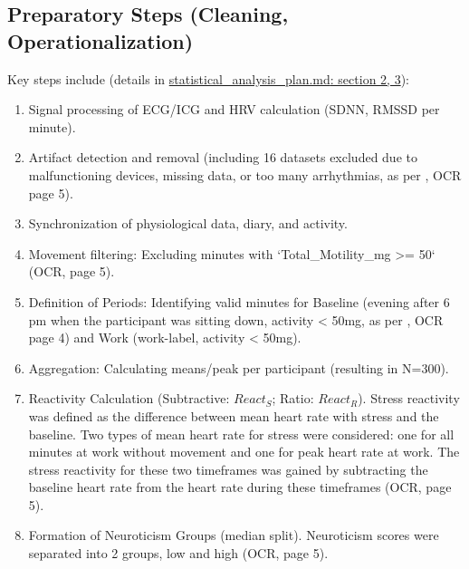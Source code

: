 \documentclass[11pt, a4paper]{report}
\newcommand{\mdcitesec}[2]{\href{run:./sources/#1}{\url{#1}: section #2}}
\begin{document}
\subsection{Preparatory Steps (Cleaning, Operationalization)}
\label{subsec:cleaning_operationalization_method} %
Key steps include (details in \mdcitesec{statistical_analysis_plan.md}{2, 3}):
\begin{enumerate}
    \item Signal processing of ECG/ICG and HRV calculation (SDNN, RMSSD per minute).
    \item Artifact detection and removal (including 16 datasets excluded due to malfunctioning devices, missing data, or too many arrhythmias, as per \cite{ThesisTempPDF}, OCR page 5).
    \item Synchronization of physiological data, diary, and activity.
    \item Movement filtering: Excluding minutes with `Total_Motility_mg >= 50` \cite{ThesisTempPDF} (OCR, page 5).
    \item Definition of Periods: Identifying valid minutes for Baseline (evening after 6 pm when the participant was sitting down, activity < 50mg, as per \cite{ThesisTempPDF}, OCR page 4) and Work (work-label, activity < 50mg).
    \item Aggregation: Calculating means/peak per participant (resulting in N=300).
    \item Reactivity Calculation (Subtractive: $React_S$; Ratio: $React_R$). Stress reactivity was defined as the difference between mean heart rate with stress and the baseline. Two types of mean heart rate for stress were considered: one for all minutes at work without movement and one for peak heart rate at work. The stress reactivity for these two timeframes was gained by subtracting the baseline heart rate from the heart rate during these timeframes \cite{ThesisTempPDF} (OCR, page 5).
    \item Formation of Neuroticism Groups (median split). Neuroticism scores were separated into 2 groups, low and high \cite{ThesisTempPDF} (OCR, page 5).
\end{enumerate}
\end{document}
